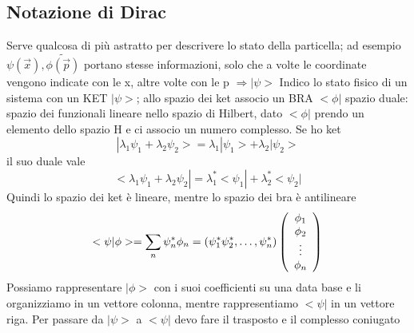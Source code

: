 \documentclass[a4paper,11pt]{report}
\theoremstyle{remark}
\theoremstyle{definition}
\begin{document}
\subsection*{Notazione di Dirac}
Serve qualcosa di più astratto per descrivere lo stato della particella; ad esempio $\psi(\vec{x}), \tilde{\phi(\vec{p})}$ portano stesse informazioni, solo che a volte le coordinate vengono indicate con le x, altre volte con le p $\Rightarrow |\psi>$ \newline
Indico lo stato fisico di un sistema con un KET $|\psi>$; allo spazio dei ket associo un BRA $<\phi|$ spazio duale: spazio dei funzionali lineare nello spazio di Hilbert, dato $<\phi|$ prendo un elemento dello spazio H e ci associo un numero complesso. \newline
Se ho ket 
\begin{equation*}
    |\lambda_1\psi_1 + \lambda_2\psi_2> = \lambda_1|\psi_1> + \lambda_2|\psi_2>
\end{equation*}
il suo duale vale 
\begin{equation*}
    <\lambda_1\psi_1 + \lambda_2\psi_2| = \lambda_1^*<\psi_1| + \lambda_2^*<\psi_2|
\end{equation*} 
Quindi lo spazio dei ket è lineare, mentre lo spazio dei bra è antilineare
\begin{equation*}
    <\psi|\phi> = \sum_n \psi_n^* \phi_n = (\psi_1^*\psi_2^*, \dots, \psi_n^*)
    \left(\begin{array}[]{c}
        \phi_1 \\
        \phi_2 \\
        \vdots \\
        \phi_n
    \end{array}\right)
\end{equation*}
Possiamo rappresentare $|\phi>$ con i suoi coefficienti su una data base e li organizziamo in un vettore colonna, mentre rappresentiamo $<\psi|$ in un vettore riga. Per passare da $|\psi>$ a $<\psi|$ devo fare il trasposto e il complesso coniugato
\end{document}
